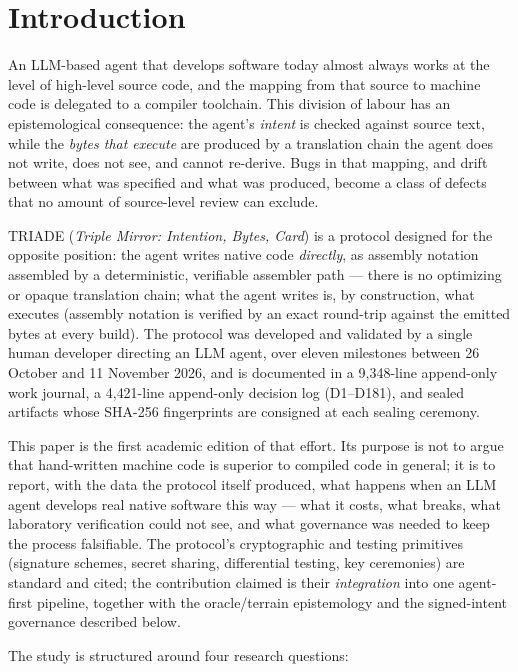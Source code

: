 \documentclass[11pt,a4paper]{article}
\begin{document}
\section{Introduction}\label{sec:intro}

An LLM-based agent that develops software today almost always works at the
level of high-level source code, and the mapping from that source to
machine code is delegated to a compiler toolchain. This division of labour
has an epistemological consequence: the agent's \emph{intent} is checked
against source text, while the \emph{bytes that execute} are produced by a
translation chain the agent does not write, does not see, and cannot
re-derive. Bugs in that mapping, and drift between what was specified and
what was produced, become a class of defects that no amount of source-level
review can exclude.

TRIADE (\emph{Triple Mirror: Intention, Bytes, Card}) is a protocol
designed for the opposite position: the agent writes native code
\emph{directly}, as assembly notation assembled by a deterministic,
verifiable assembler path --- there is no optimizing or opaque translation
chain; what the agent writes is, by construction, what executes
(assembly notation is verified by an exact round-trip against the emitted
bytes at every build). The protocol was developed and validated by a
single human developer directing an LLM agent, over eleven milestones
between 26 October and 11 November 2026, and is documented in a
9{,}348-line append-only work journal, a 4{,}421-line append-only decision
log (D1--D181), and sealed artifacts whose SHA-256 fingerprints are
consigned at each sealing ceremony.

This paper is the first academic edition of that effort. Its purpose is
not to argue that hand-written machine code is superior to compiled code
in general; it is to report, with the data the protocol itself produced,
what happens when an LLM agent develops real native software this way ---
what it costs, what breaks, what laboratory verification could not see,
and what governance was needed to keep the process falsifiable. The
protocol's cryptographic and testing primitives (signature schemes,
secret sharing, differential testing, key ceremonies) are standard and
cited; the contribution claimed is their \emph{integration} into one
agent-first pipeline, together with the oracle/terrain epistemology and
the signed-intent governance described below.

The study is structured around four research questions:
\end{document}
